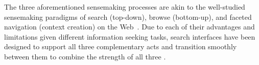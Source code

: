 {  \par The three aforementioned sensemaking processes are akin to the well-studied sensemaking paradigms of search (top-down), browse (bottom-up), and faceted navigation (context creation) on the Web~\cite{Hearst2009,Olston2003}. Due to each of their advantages and limitations given different information seeking tasks, search interfaces have been designed to support all three complementary acts and transition smoothly between them to combine the strength of all three . 
  }
